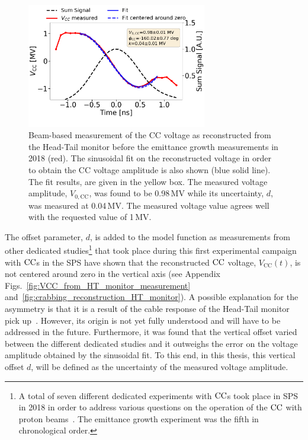 \begin{figure}[!h]
   \centering         
   \includegraphics[width=0.7\textwidth]{images/Ch5/HT_VCC_callibration_20180905_135033_sin_fit_fixed_freq_thesis.png}
       \caption{Beam-based measurement of the CC voltage as reconstructed from the Head-Tail monitor before the emittance growth measurements in 2018 (red). The sinusoidal fit on the reconstructed voltage in order to obtain the CC voltage amplitude is also shown (blue solid line). The fit results, are given in the yellow box. The measured voltage amplitude, $V_\mathrm{0, CC}$, was found to be 0.98\,MV while its uncertainty, $d$, was measured at 0.04\,MV. The measured voltage value agrees well with the requested value of 1\,MV.}
       \label{fig:crabbing_sin_fit_MD5}
\end{figure}


The offset parameter, $d$, is added to the model function as measurements from other dedicated studies\footnote{A total of seven different dedicated experiments with ${\mathrm{CC}}$s took place in SPS in 2018 in order to address various questions on the operation of the ${\mathrm{CC}}$ with proton beams~\cite{BE_seminar}. The emittance growth experiment was the fifth in chronological order.} that took place during this first experimental campaign with ${\mathrm{CC}}$s in the SPS have shown that the reconstructed ${\mathrm{CC}}$ voltage, $V_\mathrm{CC}(t)$, is not centered around zero in the vertical axis (see Appendix Figs.~\ref{fig:VCC_from_HT_monitor_measurement} and~\ref{fig:crabbing_reconstruction_HT_monitor}). A possible explanation for the asymmetry is that it is a result of the cable response of the Head-Tail monitor pick up~\cite{Levens_WP2_HT_CC_diagnostic}. However, its origin is not yet fully understood and will have to be addressed in the future. Furthermore, it was found that the vertical offset varied between the different dedicated studies and it outweighs the error on the voltage amplitude obtained by the sinusoidal fit. To this end, in this thesis, this vertical offset $d$, will be defined as the uncertainty of the measured voltage amplitude. 

